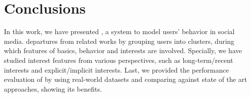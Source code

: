 \section{Conclusions}
\label{sec:conclu}

In this work, we have presented \sys{}, a system to model users' \retg{} behavior in social media. 
\sys{} departures from related works by grouping users into clusters, during which features of basics, behavior and interests are involved. 
Specially, we have studied interest features from various perspectives, such as long-term/recent interests and explicit/implicit interests. 
Last, we provided the performance evaluation of \sys{} by using real-world datasets and comparing against state of the art approaches, showing its benefits.
 